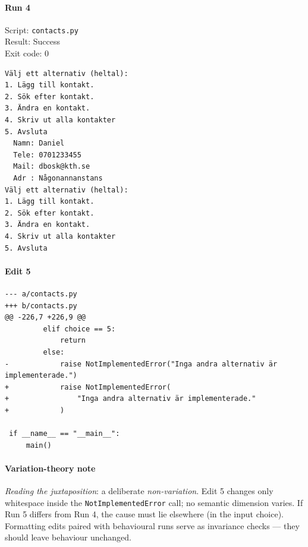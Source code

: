 \documentclass{article}
\begin{document}
\noindent
\begin{minipage}[t]{0.48\linewidth}
\paragraph{Run 4}
Script: \texttt{contacts.py} \\
Result: Success \\
Exit code: 0

\begin{verbatim}
Välj ett alternativ (heltal):
1. Lägg till kontakt.
2. Sök efter kontakt.
3. Ändra en kontakt.
4. Skriv ut alla kontakter
5. Avsluta
  Namn: Daniel
  Tele: 0701233455
  Mail: dbosk@kth.se
  Adr : Någonannanstans
Välj ett alternativ (heltal):
1. Lägg till kontakt.
2. Sök efter kontakt.
3. Ändra en kontakt.
4. Skriv ut alla kontakter
5. Avsluta
\end{verbatim}
\end{minipage}
\hfill
\begin{minipage}[t]{0.48\linewidth}
\paragraph{Edit 5}
\begin{verbatim}
--- a/contacts.py
+++ b/contacts.py
@@ -226,7 +226,9 @@
         elif choice == 5:
             return
         else:
-            raise NotImplementedError("Inga andra alternativ är implementerade.")
+            raise NotImplementedError(
+                "Inga andra alternativ är implementerade."
+            )
 
 if __name__ == "__main__":
     main()
\end{verbatim}
\end{minipage}

\paragraph*{Variation-theory note}
\textit{Reading the juxtaposition}: a deliberate \emph{non-variation}.
Edit 5 changes only whitespace inside the \verb|NotImplementedError|
call; no semantic dimension varies. If Run 5 differs from Run 4, the
cause must lie elsewhere (in the input choice). Formatting edits
paired with behavioural runs serve as invariance checks --- they
should leave behaviour unchanged.

\vspace{1em}
\end{document}
